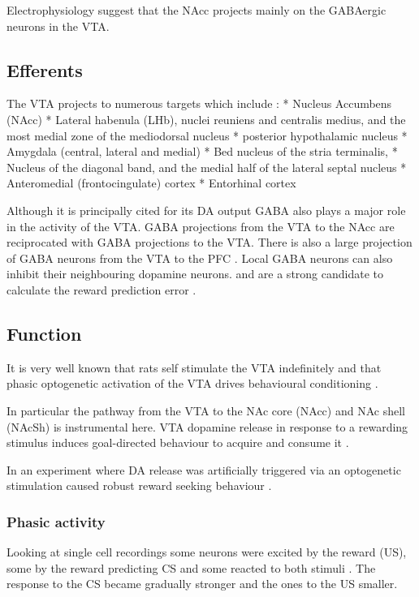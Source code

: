 \documentclass[12pt,a4paper]{article}
\begin{document}
Electrophysiology suggest that the NAcc projects mainly on the GABAergic neurons in the VTA.

\subsection{Efferents}

The VTA projects to numerous targets which include \citep{Beckstead1979}:
  * Nucleus Accumbens (NAcc)
  * Lateral habenula (LHb), nuclei reuniens and centralis medius, and the most medial zone of the mediodorsal nucleus 
  * posterior hypothalamic nucleus 
  * Amygdala (central, lateral and medial)
  * Bed nucleus of the stria terminalis, 
  * Nucleus of the diagonal band, and the medial half of the lateral septal nucleus
  * Anteromedial (frontocingulate) cortex
  * Entorhinal cortex

Although it is principally cited for its DA output GABA also plays a major role in the activity of the VTA. 
GABA projections from the VTA to the NAcc are reciprocated with GABA projections to the VTA. There is also a large projection of GABA neurons from the VTA to the PFC \citep{Carr2000}. Local GABA neurons can also inhibit their neighbouring dopamine neurons.\citep{Sesack2010} and are a strong candidate to calculate the reward prediction error \citep{Eshel2015}.


\subsection{Function}

It is very well known that rats self stimulate the VTA indefinitely \citep{Stuber2016} and that phasic optogenetic activation of the VTA drives behavioural conditioning \citep{Tsai2009}.

In particular the pathway from the VTA to the NAc core (NAcc) and NAc shell (NAcSh) is instrumental here. VTA dopamine release in response to a rewarding stimulus induces goal-directed behaviour to acquire and consume it \citep{Morales2017}.

In an experiment where DA release was artificially triggered via an optogenetic stimulation caused robust reward seeking behaviour \citep{Steinberg2013}.

\subsubsection{Phasic activity}

Looking at single cell recordings some neurons were excited by the reward (US), some by the reward predicting CS and some reacted to both stimuli \citep{Cohen2012}. The response to the CS became gradually stronger and the ones to the US smaller.
\end{document}
